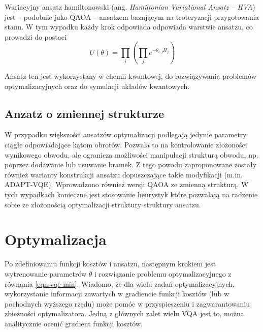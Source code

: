 \documentclass[a4paper,11pt]{article}
\newcommand{\ang}[1]{(ang. \emph{#1})}
\begin{document}
Wariacyjny ansatz hamiltonowski \ang{Hamiltonian Variational Ansatz -- HVA} jest -- podobnie jako QAOA -- ansatzem bazującym na troteryzacji przygotowania stanu. W tym wypadku każdy krok odpowiada odpowiada warstwie ansatzu, co prowadzi do postaci
\begin{equation}
	U(\theta)  = \prod_i \left( \prod_j e^{-\theta_{i,j} H_j} \right)
\end{equation}

 Ansatz ten jest wykorzystany w chemii kwantowej, do rozwiązywania problemów optymalizacyjnych oraz do symulacji układów kwantowych.

\subsection{Anzatz o zmiennej strukturze}

W przypadku większości ansatzów optymalizacji podlegają jedynie parametry ciągłe odpowiadające kątom obrotów. Pozwala to na kontrolowanie złożoności wynikowego obwodu, ale ogranicza możliwości manipulacji strukturą obwodu, np. poprzez dodawanie lub usuwanie bramek. Z tego powodu zaproponowane zostały również warianty konstrukcji ansatzu dopuszczające takie modyfikacji (m.in. ADAPT-VQE). Wprowadzono również wersji QAOA ze zmienną strukturą. W tych wypadkach konieczne jest stosowanie heurystyk które pozwalają na radzenie sobie ze złożonością optymalizacji struktury struktury ansatzu.

\hypertarget{optymalizacja}{%
	\section{Optymalizacja}\label{optymalizacja}}

Po zdefiniowaniu funkcji kosztów i ansatzu, następnym krokiem jest wytrenowanie parametrów $\theta$ i rozwiązanie problemu optymalizacyjnego z równania \ref{eqn:vqe-min}. Wiadomo, że dla wielu zadań optymalizacyjnych, wykorzystanie informacji zawartych w gradiencie funkcji kosztów (lub w pochodnych wyższego rzędu) może pomóc w przyspieszeniu i zagwarantowaniu zbieżności optymalizatora. Jedną z głównych zalet wielu VQA jest to, można analitycznie ocenić gradient funkcji kosztów.
\end{document}
